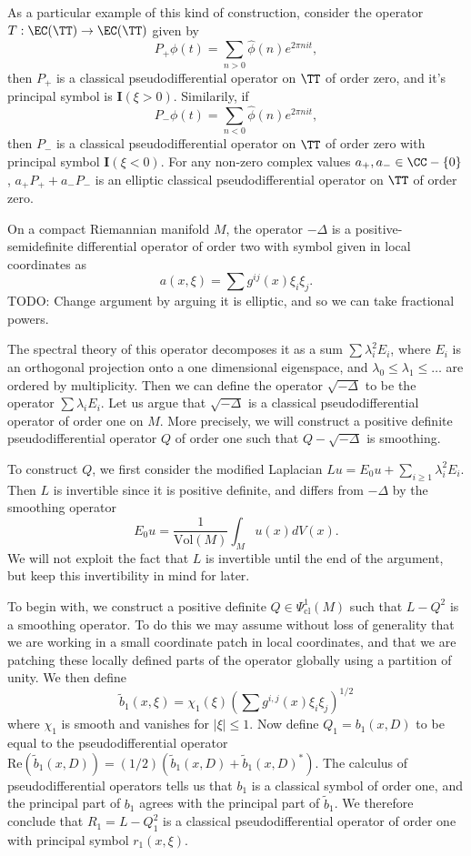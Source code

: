 \begin{example}
    As a particular example of this kind of construction, consider the operator $T: \EC(\TT) \to \EC(\TT)$ given by
    \[ P_+ \phi(t) = \sum_{n > 0} \widehat{\phi}(n) e^{2 \pi nit}, \]
    then $P_+$ is a classical pseudodifferential operator on $\TT$ of order zero, and it's principal symbol is $\mathbf{I}(\xi > 0)$. Similarily, if
    \[ P_- \phi(t) = \sum_{n < 0} \widehat{\phi}(n) e^{2 \pi nit}, \]
    then $P_-$ is a classical pseudodifferential operator on $\TT$ of order zero with principal symbol $\mathbf{I}(\xi < 0)$. For any non-zero complex values $a_+,a_- \in \CC - \{ 0 \}$, $a_+ P_+ + a_- P_-$ is an elliptic classical pseudodifferential operator on $\TT$ of order zero.
\end{example}

\begin{example}
    On a compact Riemannian manifold $M$, the operator $- \Delta$ is a positive-semidefinite differential operator of order two with symbol given in local coordinates as
    \[ a(x,\xi) = \sum g^{ij}(x) \xi_i \xi_j. \]
    TODO: Change argument by arguing it is elliptic, and so we can take fractional powers.

    The spectral theory of this operator decomposes it as a sum $\sum \lambda_i^2 E_i$, where $E_i$ is an orthogonal projection onto a one dimensional eigenspace, and $\lambda_0 \leq \lambda_1 \leq \dots$ are ordered by multiplicity. Then we can define the operator $\sqrt{-\Delta}$ to be the operator $\sum \lambda_i E_i$. Let us argue that $\sqrt{-\Delta}$ is a classical pseudodifferential operator of order one on $M$. More precisely, we will construct a positive definite pseudodifferential operator $Q$ of order one such that $Q - \sqrt{-\Delta}$ is smoothing.

    To construct $Q$, we first consider the modified Laplacian $Lu = E_0u + \sum_{i \geq 1} \lambda_i^2 E_i$. Then $L$ is invertible since it is positive definite, and differs from $- \Delta$ by the smoothing operator
    \[ E_0 u = \frac{1}{\text{Vol}(M)} \int_M u(x) dV(x). \]
    We will not exploit the fact that $L$ is invertible until the end of the argument, but keep this invertibility in mind for later.

    To begin with, we construct a positive definite $Q \in \Psi_{\text{cl}}^1(M)$ such that $L - Q^2$ is a smoothing operator. To do this we may assume without loss of generality that we are working in a small coordinate patch in local coordinates, and that we are patching these locally defined parts of the operator globally using a partition of unity. We then define
    \[ \tilde{b}_1(x,\xi) = \chi_1(\xi) \left( \sum g^{i,j}(x) \xi_i \xi_j \right)^{1/2} \]
    where $\chi_1$ is smooth and vanishes for $|\xi| \leq 1$. Now define $Q_1 = b_1(x,D)$ to be equal to the pseudodifferential operator $\text{Re}(\tilde{b}_1(x,D)) = (1/2)(\tilde{b}_1(x,D) + \tilde{b}_1(x,D)^*)$. The calculus of pseudodifferential operators tells us that $b_1$ is a classical symbol of order one, and the principal part of $b_1$ agrees with the principal part of $\tilde{b}_1$. We therefore conclude that $R_1 = L - Q_1^2$ is a classical pseudodifferential operator of order one with principal symbol $r_1(x,\xi)$.


\end{example}
